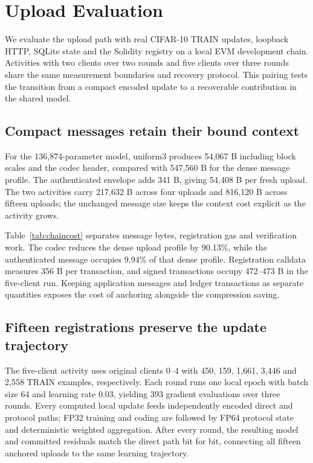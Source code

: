 \section{Upload Evaluation}\label{sec:uploadeval}
We evaluate the upload path with real CIFAR-10 TRAIN updates, loopback HTTP, SQLite state and the Solidity registry on a local EVM development chain. Activities with two clients over two rounds and five clients over three rounds share the same measurement boundaries and recovery protocol. This pairing tests the transition from a compact encoded update to a recoverable contribution in the shared model.

\subsection{Compact messages retain their bound context}
For the 136,874-parameter model, uniform3 produces 54,067 B including block scales and the codec header, compared with 547,560 B for the dense message profile. The authenticated envelope adds 341 B, giving 54,408 B per fresh upload. The two activities carry 217,632 B across four uploads and 816,120 B across fifteen uploads; the unchanged message size keeps the context cost explicit as the activity grows.

Table~\ref{tab:chaincost} separates message bytes, registration gas and verification work. The codec reduces the dense upload profile by 90.13\%, while the authenticated message occupies 9.94\% of that dense profile. Registration calldata measures 356 B per transaction, and signed transactions occupy 472--473 B in the five-client run. Keeping application messages and ledger transactions as separate quantities exposes the cost of anchoring alongside the compression saving.


\subsection{Fifteen registrations preserve the update trajectory}
The five-client activity uses original clients 0--4 with 450, 159, 1,661, 3,446 and 2,558 TRAIN examples, respectively. Each round runs one local epoch with batch size 64 and learning rate 0.03, yielding 393 gradient evaluations over three rounds. Every computed local update feeds independently encoded direct and protocol paths; FP32 training and coding are followed by FP64 protocol state and deterministic weighted aggregation. After every round, the resulting model and committed residuals match the direct path bit for bit, connecting all fifteen anchored uploads to the same learning trajectory.

